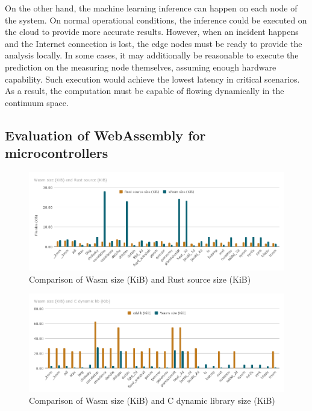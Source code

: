 On the other hand, the machine learning inference can happen on each node of the system. On normal operational conditions, the inference could be executed on the cloud to provide more accurate results. However, when an incident happens and the Internet connection is lost, the edge nodes must be ready to provide the analysis locally. In some cases, it may additionally be reasonable to execute the prediction on the measuring node themselves, assuming enough hardware capability. Such execution would achieve the lowest latency in critical scenarios. As a result, the computation must be capable of flowing dynamically in the continuum space.

\subsection{Evaluation of WebAssembly for microcontrollers}

\begin{figure}[h]
\centering
\includegraphics[width=\columnwidth]{figures/b-wasmi-2}
\caption{Comparison of Wasm size (KiB) and Rust source size (KiB) \label{fig:b-wasmi-2}}
\end{figure}

\begin{figure}[h]
\centering
\includegraphics[width=\columnwidth]{figures/b-wasmi-3}
\caption{Comparison of Wasm size (KiB) and C dynamic library size (KiB) \label{fig:b-wasmi-3}}
\end{figure}


